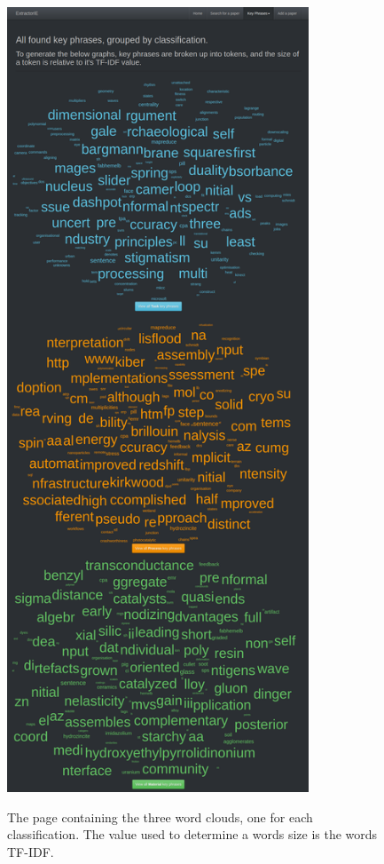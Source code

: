 \begin{figure}
	\centering
	\includegraphics[width=9cm]{img/extractorie-kp.png} \\
	\caption[The Word Cloud page of the Website]{The page containing the three word clouds, one for each classification. The value used to determine a words size is the words TF-IDF.}
	\label{figure:extractoriecloud}
\end{figure}

